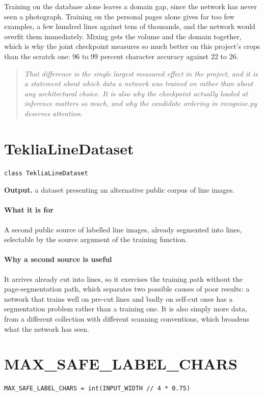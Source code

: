 Training on the database alone leaves a domain gap, since the network has never seen a photograph. Training on the personal pages alone gives far too few examples, a few hundred lines against tens of thousands, and the network would overfit them immediately. Mixing gets the volume and the domain together, which is why the joint checkpoint measures so much better on this project's crops than the scratch one: 96 to 99 percent character accuracy against 22 to 26.


\begin{quote}\small\itshape That difference is the single largest measured effect in the project, and it is a statement about which data a network was trained on rather than about any architectural choice. It is also why the checkpoint actually loaded at inference matters so much, and why the candidate ordering in recognise.py deserves attention.\end{quote}

\section{TekliaLineDataset}
\begin{lstlisting}[style=sig]
class TekliaLineDataset
\end{lstlisting}

\noindent\textbf{Output.} a dataset presenting an alternative public corpus of line images.


\paragraph{What it is for}
A second public source of labelled line images, already segmented into lines, selectable by the source argument of the training function.


\paragraph{Why a second source is useful}
It arrives already cut into lines, so it exercises the training path without the page-segmentation path, which separates two possible causes of poor results: a network that trains well on pre-cut lines and badly on self-cut ones has a segmentation problem rather than a training one. It is also simply more data, from a different collection with different scanning conventions, which broadens what the network has seen.


\section{MAX\_SAFE\_LABEL\_CHARS}
\begin{lstlisting}[style=sig]
MAX_SAFE_LABEL_CHARS = int(INPUT_WIDTH // 4 * 0.75)
\end{lstlisting}

